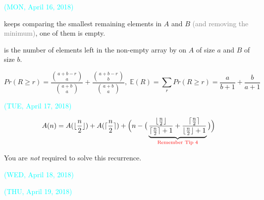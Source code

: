 \begin{frame}{}
  {\vspace{-0.30cm} \centerline{\textcolor{cyan}{\small (MON, April 16, 2018)}}}

  \vspace{0.50cm}
   keeps comparing the smallest remaining elements in $A$ and $B$
  {\small \textcolor{gray}{(and removing the minimum)}},  one of them is empty.

  \begin{definition}[$R$]
     is the number of elements left in the non-empty array by 
    on $A$ of size $a$ and $B$ of size $b$.
  \end{definition}

  \begin{theorem}
    \vspace{-0.50cm}
    \[
      Pr(R \ge r) = \frac{\binom{a + b - r}{a}}{\binom{a + b}{a}} + \frac{\binom{a + b - r}{b}}{\binom{a + b}{a}},
      \; \mathbb{E}(R) = \sum_{r} Pr(R \ge r) = \frac{a}{b+1} + \frac{b}{a+1}
    \]
  \end{theorem}
\end{frame}

\begin{frame}{}
  {\vspace{-0.50cm} \centerline{\textcolor{cyan}{\small (TUE, April 17, 2018)}}}

  \vspace{0.50cm}
  \[
    A(n) = A(\lfloor \frac{n}{2} \rfloor) + A(\lceil \frac{n}{2} \rceil) + 
    \Big(n - \big(\underbrace{\frac{\lfloor \frac{n}{2} \rfloor}{\lceil \frac{n}{2} \rceil + 1} 
    + \frac{\lceil \frac{n}{2} \rceil}{\lfloor \frac{n}{2} \rfloor + 1}}_{\text{\textcolor{red}{Remember Tip $4$}}}\big)\Big)
  \]

  \vspace{0.80cm}
  \centerline{You are {\it not} required to solve this recurrence.}
\end{frame}

\begin{frame}{}
  {\vspace{-0.50cm} \centerline{\textcolor{cyan}{\small (WED, April 18, 2018)}}}

\end{frame}

\begin{frame}{}
  {\vspace{-0.50cm} \centerline{\textcolor{cyan}{\small (THU, April 19, 2018)}}}

\end{frame}
